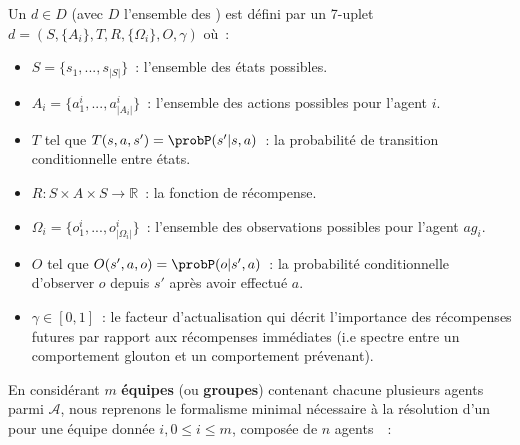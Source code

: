 Un  $d \in D$ (avec $D$ l'ensemble des ) est défini par un 7-uplet $d = (S,\{A_i\},T,R,\{\Omega_i\},O,\gamma)$ où~:
\begin{itemize}
  \item $S = \{s_1, ..., s_{|S|}\}$~: l'ensemble des états possibles.
  \item $A_i = \{a_1^i, ..., a_{|A_i|}^i\}$~: l'ensemble des actions possibles pour l'agent $i$.
  \item $T$ tel que $T(s,a,s') = \probP(s'|s,a)$~: la probabilité de transition conditionnelle entre états.
  \item $R: S \times A \times S \rightarrow \mathbb{R}$~: la fonction de récompense.
  \item $\Omega_i = \{o_1^i, ..., o_{|\Omega_i|}^i\}$~: l'ensemble des observations possibles pour l'agent $ag_i$.
  \item $O$ tel que $O(s',a,o) = \probP(o|s',a)$~: la probabilité conditionnelle d'observer $o$ depuis $s'$ après avoir effectué $a$.
  \item $\gamma \in [0,1]$~: le facteur d'actualisation qui décrit l'importance des récompenses futures par rapport aux récompenses immédiates (i.e spectre entre un comportement glouton et un comportement prévenant).
\end{itemize}

En considérant $m$ \textbf{équipes} (ou \textbf{groupes}) contenant chacune plusieurs agents parmi $\mathcal{A}$, nous reprenons le formalisme minimal nécessaire à la résolution d'un  pour une équipe donnée $i, 0 \leq i \leq m$, composée de $n$ agents~\cite{Beynier2013,Albrecht2024}~:

